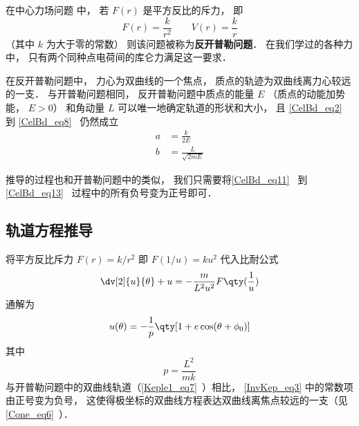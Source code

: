 

在中心力场问题 中， 若 $F(r)$ 是平方反比的斥力， 即
\begin{equation}
F(r) = \frac{k}{r^2}  \qquad V(r) = \frac{k}{r}
\end{equation}
（其中 $k$ 为大于零的常数） 则该问题被称为\textbf{反开普勒问题}． 在我们学过的各种力中， 只有两个同种点电荷间的库仑力满足这一要求．

在反开普勒问题中， 力心为双曲线的一个焦点， 质点的轨迹为双曲线离力心较远的一支． 与开普勒问题相同， 反开普勒问题中质点的能量 $E$ （质点的动能加势能， $E>0$） 和角动量 $L$ 可以唯一地确定轨道的形状和大小， 且 \autoref{CelBd_eq2}~ 到 \autoref{CelBd_eq8}~ 仍然成立
\begin{align}
a &= \frac{k}{2E}\\
b &= \frac{L}{\sqrt{2mE}}
\end{align}

推导的过程也和开普勒问题中的类似， 我们只需要将\autoref{CelBd_eq11}~ 到\autoref{CelBd_eq13}~ 过程中的所有负号变为正号即可．

\subsection{轨道方程推导}

将平方反比斥力 $F(r) = k/r^2$ 即 $F(1/u) = ku^2$ 代入比耐公式
\begin{equation}
\dv[2]{u}{\theta} + u = -\frac{m}{L^2 u^2} F\qty(\frac 1u)
\end{equation}
通解为
\begin{equation}\label{InvKep_eq3}
u(\theta) = -\frac{1}{p} \qty[1 + e\cos(\theta  + \phi_0)]
\end{equation}
其中
\begin{equation}
p = \frac{L^2}{mk}
\end{equation}
与开普勒问题中的双曲线轨道（\autoref{Keple1_eq7}~）相比， \autoref{InvKep_eq3} 中的常数项由正号变为负号， 这使得极坐标的双曲线方程表达双曲线离焦点较远的一支（见\autoref{Cone_eq6}~）．